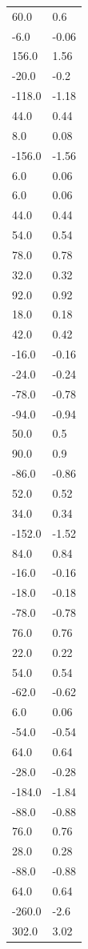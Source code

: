\begin{longtable}{ll}
60.0 & 0.6 \\
-6.0 & -0.06 \\
156.0 & 1.56 \\
-20.0 & -0.2 \\
-118.0 & -1.18 \\
44.0 & 0.44 \\
8.0 & 0.08 \\
-156.0 & -1.56 \\
6.0 & 0.06 \\
6.0 & 0.06 \\
44.0 & 0.44 \\
54.0 & 0.54 \\
78.0 & 0.78 \\
32.0 & 0.32 \\
92.0 & 0.92 \\
18.0 & 0.18 \\
42.0 & 0.42 \\
-16.0 & -0.16 \\
-24.0 & -0.24 \\
-78.0 & -0.78 \\
-94.0 & -0.94 \\
50.0 & 0.5 \\
90.0 & 0.9 \\
-86.0 & -0.86 \\
52.0 & 0.52 \\
34.0 & 0.34 \\
-152.0 & -1.52 \\
84.0 & 0.84 \\
-16.0 & -0.16 \\
-18.0 & -0.18 \\
-78.0 & -0.78 \\
76.0 & 0.76 \\
22.0 & 0.22 \\
54.0 & 0.54 \\
-62.0 & -0.62 \\
6.0 & 0.06 \\
-54.0 & -0.54 \\
64.0 & 0.64 \\
-28.0 & -0.28 \\
-184.0 & -1.84 \\
-88.0 & -0.88 \\
76.0 & 0.76 \\
28.0 & 0.28 \\
-88.0 & -0.88 \\
64.0 & 0.64 \\
-260.0 & -2.6 \\
302.0 & 3.02 \\

\end{longtable}
